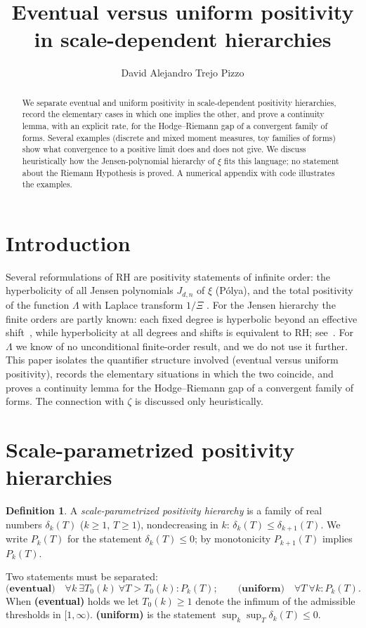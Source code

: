 \documentclass[11pt]{amsart}
\title[Eventual versus uniform positivity]{Eventual versus uniform positivity in
scale-dependent hierarchies}
\author{David Alejandro Trejo Pizzo}
\theoremstyle{definition}
\newtheorem{definition}[theorem]{Definition}
\theoremstyle{remark}
\begin{document}
\begin{abstract}
We separate eventual and uniform positivity in scale-dependent positivity
hierarchies, record the elementary cases in which one implies the other, and
prove a continuity lemma, with an explicit rate, for the Hodge--Riemann gap of a
convergent family of forms. Several examples (discrete and mixed moment measures,
toy families of forms) show what convergence to a positive limit does and does
not give. We discuss heuristically how the Jensen-polynomial hierarchy of $\xi$
fits this language; no statement about the Riemann Hypothesis is proved. A
numerical appendix with code illustrates the examples.
\end{abstract}
\maketitle

\tableofcontents
\newpage

\section{Introduction}
Several reformulations of RH are positivity statements of infinite order:
the hyperbolicity of all Jensen polynomials $J_{d,n}$ of $\xi$ (P\'olya), and
the total positivity of the function $\Lambda$ with Laplace transform $1/\Xi$
\cite{RP06}. For the Jensen hierarchy the finite orders are partly known: each
fixed degree is hyperbolic beyond an effective shift~\cite{GORZ}, while
hyperbolicity at all degrees and shifts is equivalent to RH;
see~\cite{RP06,RP14}. For $\Lambda$ we know of no unconditional finite-order
result, and we do not use it further. This paper isolates the quantifier
structure involved (eventual versus uniform positivity), records the elementary
situations in which the two coincide, and proves a continuity lemma for the
Hodge--Riemann gap of a convergent family of forms. The connection with $\zeta$
is discussed only heuristically.

\section{Scale-parametrized positivity hierarchies}
\begin{definition}
A \emph{scale-parametrized positivity hierarchy} is a family of real numbers
$\delta_k(T)$ ($k\ge1$, $T\ge1$), nondecreasing in $k$:
$\delta_k(T)\le\delta_{k+1}(T)$. We write $P_k(T)$ for the statement
$\delta_k(T)\le0$; by monotonicity $P_{k+1}(T)$ implies $P_k(T)$.
\end{definition}
Two statements must be separated:
\[
\textbf{(eventual)}\quad\forall k\ \exists T_0(k)\ \forall T>T_0(k):P_k(T);
\qquad
\textbf{(uniform)}\quad\forall T\ \forall k:P_k(T).
\]
When \textbf{(eventual)} holds we let $T_0(k)\ge1$ denote the infimum of the
admissible thresholds in $[1,\infty)$. \textbf{(uniform)} is the
statement $\sup_k\sup_T\delta_k(T)\le0$.
\end{document}
